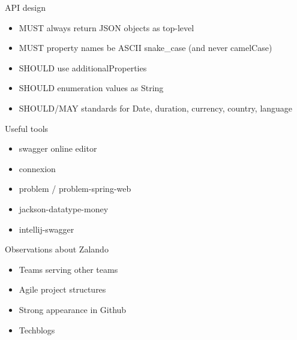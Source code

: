 \documentclass[10pt]{beamer}
\begin{document}
\begin{frame}{API design}

  \begin{itemize}

    \item
          MUST always return JSON objects as top-level
    \item
          MUST property names be ASCII snake\_case (and never camelCase)
    \item
          SHOULD use additionalProperties
    \item
          SHOULD enumeration values as String
    \item
          SHOULD/MAY standards for Date, duration, currency, country, language
  \end{itemize}

\end{frame}

\begin{frame}{Useful tools}

  \begin{itemize}

    \item
          swagger online editor
    \item
          connexion
    \item
          problem / problem-spring-web
    \item
          jackson-datatype-money
    \item
          intellij-swagger
  \end{itemize}

\end{frame}

\begin{frame}{Observations about Zalando}

  \begin{itemize}

    \item
          Teams serving other teams
    \item
          Agile project structures
    \item
          Strong appearance in Github
    \item
          Techblogs
  \end{itemize}

\end{frame}
\end{document}

